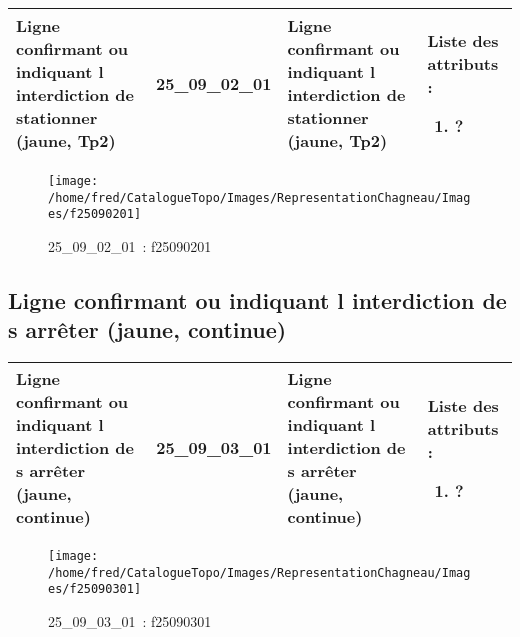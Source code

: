 \documentclass[12pt,titlepage]{book}
\begin{document}
\renewcommand{\arraystretch}{1.2}
\begin{supertabular}{|p{10cm}|c|p{13cm}|p{12cm}|}
 Ligne confirmant ou indiquant l interdiction de stationner (jaune, Tp2) & 25\_09\_02\_01 & Ligne confirmant ou indiquant l interdiction de stationner (jaune, Tp2) & Liste des attributs :
\begin{enumerate}
  \item ?\end{enumerate}
\\
\hline
\end{supertabular}
\begin{figure}[h!]
  \hfill         %
  \begin{minipage}[t]{3cm}
    \begin{center}
      \texttt{[image: /home/fred/CatalogueTopo/Images/RepresentationChagneau/Images/f25090201]}
      \caption[~25\_09\_02\_01]{\small{25\_09\_02\_01~:} \tiny{f25090201}}\label{f25090201}
    \end{center}
  \end{minipage}
\end{figure}


\subsection{Ligne confirmant ou indiquant l interdiction de s arrêter (jaune, continue)}
\noindent
\vspace{\baselineskip}

\renewcommand{\arraystretch}{1.2}
\begin{supertabular}{|p{10cm}|c|p{13cm}|p{12cm}|}
 Ligne confirmant ou indiquant l interdiction de s arrêter (jaune, continue) & 25\_09\_03\_01 & Ligne confirmant ou indiquant l interdiction de s arrêter (jaune, continue) & Liste des attributs :
\begin{enumerate}
  \item ?\end{enumerate}
\\
\hline
\end{supertabular}
\begin{figure}[h!]
  \hfill         %
  \begin{minipage}[t]{3cm}
    \begin{center}
      \texttt{[image: /home/fred/CatalogueTopo/Images/RepresentationChagneau/Images/f25090301]}
      \caption[~25\_09\_03\_01]{\small{25\_09\_03\_01~:} \tiny{f25090301}}\label{f25090301}
    \end{center}
  \end{minipage}
\end{figure}
\end{document}
